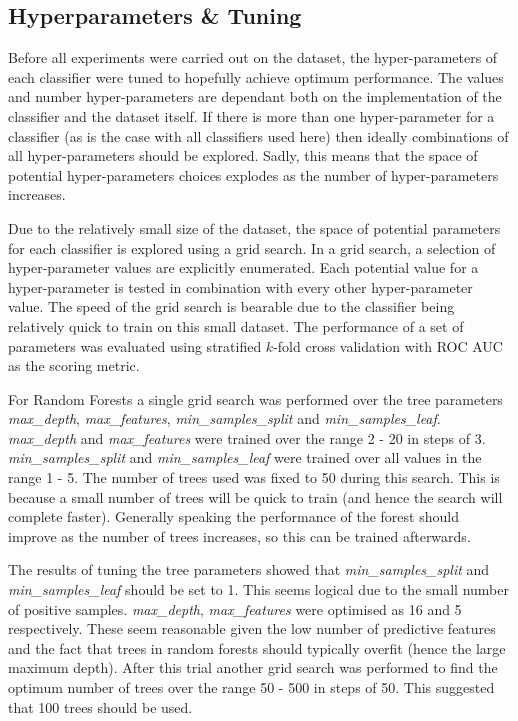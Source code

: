 \documentclass[journal]{IEEEtran}
\begin{document}
\subsection{Hyperparameters \& Tuning}
\label{subsec:tuning}

Before all experiments were carried out on the dataset, the hyper-parameters of each classifier were tuned to hopefully achieve optimum performance. The values and number hyper-parameters are dependant both on the implementation of the classifier and the dataset itself. If there is more than one hyper-parameter for a classifier (as is the case with all classifiers used here) then ideally combinations of all hyper-parameters should be explored. Sadly, this means that the space of potential hyper-parameters choices explodes as the number of hyper-parameters increases.

Due to the relatively small size of the dataset, the space of potential parameters for each classifier is explored using a grid search. In a grid search, a selection of hyper-parameter values are explicitly enumerated. Each potential value for a hyper-parameter is tested in combination with every other hyper-parameter value. The speed of the grid search is bearable due to the classifier being relatively quick to train on this small dataset. The performance of a set of parameters was evaluated using stratified $k$-fold cross validation with ROC AUC as the scoring metric.

For Random Forests a single grid search was performed over the tree parameters \textit{max\_depth}, \textit{max\_features}, \textit{min\_samples\_split} and \textit{min\_samples\_leaf}. \textit{max\_depth} and \textit{max\_features} were trained over the range 2 - 20 in steps of 3. \textit{min\_samples\_split} and \textit{min\_samples\_leaf} were trained over all values in the range 1 - 5. The number of trees used was fixed to 50 during this search. This is because a small number of trees will be quick to train (and hence the search will complete faster). Generally speaking the performance of the forest should improve as the number of trees increases, so this can be trained afterwards.

The results of tuning the tree parameters showed that \textit{min\_samples\_split} and \textit{min\_samples\_leaf} should be set to 1. This seems logical due to the small number of positive samples. \textit{max\_depth}, \textit{max\_features} were optimised as 16 and 5 respectively. These seem reasonable given the low number of predictive features and the fact that trees in random forests should typically overfit (hence the large maximum depth). After this trial another grid search was performed to find the optimum number of trees over the range 50 - 500 in steps of 50. This suggested that 100 trees should be used. 
\end{document}
